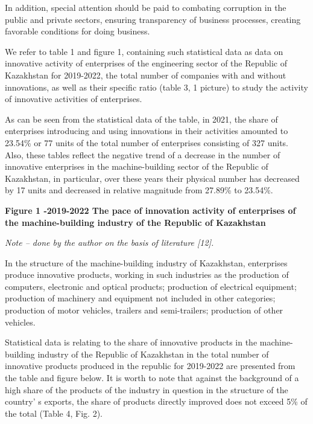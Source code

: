 \begin{multicols}{2}
In addition, special attention should be paid to combating corruption in
the public and private sectors, ensuring transparency of business
processes, creating favorable conditions for doing business.

We refer to table 1 and figure 1, containing such statistical data as
data on innovative activity of enterprises of the engineering sector of
the Republic of Kazakhstan for 2019-2022, the total number of companies
with and without innovations, as well as their specific ratio (table 3,
1 picture) to study the activity of innovative activities of
enterprises.

As can be seen from the statistical data of the table, in 2021, the
share of enterprises introducing and using innovations in their
activities amounted to 23.54\% or 77 units of the total number of
enterprises consisting of 327 units. Also, these tables reflect the
negative trend of a decrease in the number of innovative enterprises in
the machine-building sector of the Republic of Kazakhstan, in
particular, over these years their physical number has decreased by 17
units and decreased in relative magnitude from 27.89\% to 23.54\%.
\end{multicols}

{\bfseries Figure 1 -2019-2022 The pace of innovation activity of enterprises of the machine-building industry of the Republic of Kazakhstan}

\emph{Note -- done by the author on the basis of literature {[}12{]}.}

\begin{multicols}{2}
In the structure of the machine-building industry of Kazakhstan,
enterprises produce innovative products, working in such industries as
the production of computers, electronic and optical products; production
of electrical equipment; production of machinery and equipment not
included in other categories; production of motor vehicles, trailers and
semi-trailers; production of other vehicles.

Statistical data is relating to the share of innovative products in the
machine-building industry of the Republic of Kazakhstan in the total
number of innovative products produced in the republic for 2019-2022 are
presented from the table and figure below. It is worth to note that
against the background of a high share of the products of the industry
in question in the structure of the country' s exports,
the share of products directly improved does not exceed 5\% of the total
(Table 4, Fig. 2).
\end{multicols}

